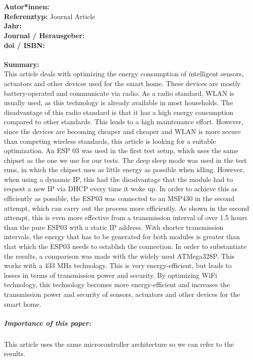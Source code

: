 \documentclass{report}
\newcommand{\createJournalArticleHeader}[1]{
    {\let\clearpage\relax \chapter{\citetitle{#1}}}
    \noindent
    \textbf{Autor*innen:} \citeauthor{#1} \\
    \textbf{Referenztyp:} Journal Article\\
    \textbf{Jahr:} \citeyear{#1} \\
    \textbf{Journal / Herausgeber:} \citefield{#1}{journaltitle}\\
    \textbf{doi / ISBN:} \citefield{#1}{doi} \\\\
    \textbf{Summary:}\\
}
\begin{document}

\createJournalArticleHeader{thomas_optimizing_2016}
This article deals with optimizing the energy consumption of intelligent sensors, actuators and other devices used for the smart home. These devices are mostly battery-operated and communicate via radio.
As a radio standard, WLAN is usually used, as this technology is already available in most households. The disadvantage of this radio standard is that it has a high energy consumption compared to other standards. This leads to a high maintenance effort. However, since the devices are becoming cheaper and cheaper and WLAN is more secure than competing wireless standards, this article is looking for a suitable optimization.
An ESP 03 was used in the first test setup, which uses the same chipset as the one we use for our tests.
The deep sleep mode was used in the test runs, in which the chipset uses as little energy as possible when idling. However, when using a dynamic IP, this had the disadvantage that the module had to request a new IP via DHCP every time it woke up. In order to achieve this as efficiently as possible, the ESP03 was connected to an MSP430 in the second attempt, which can carry out the process more efficiently. As shown in the second attempt, this is even more effective from a transmission interval of over 1.5 hours than the pure ESP03 with a static IP address. With shorter transmission intervals, the energy that has to be generated for both modules is greater than that which the ESP03 needs to establish the connection. In order to substantiate the results, a comparison was made with the widely used ATMega328P. This works with a 433 MHz technology. This is very energy-efficient, but leads to losses in terms of transmission power and security. By optimizing WiFi technology, this technology becomes more energy-efficient and increases the transmission power and security of sensors, actuators and other devices for the smart home.
\\
\paragraph{Importance of this paper:}
This article uses the same microcontroller architecture so we can refer to the results.
	
\end{document}
